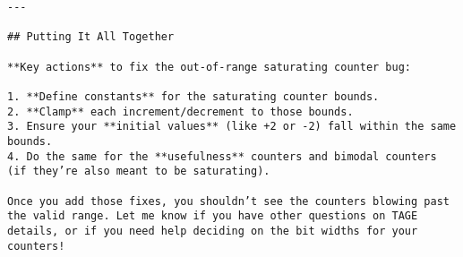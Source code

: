 \documentclass[sigconf, screen]{acmart}
\begin{document}
\begin{Verbatim}[fontsize=\tiny, breaklines=true]
---

## Putting It All Together

**Key actions** to fix the out-of-range saturating counter bug:

1. **Define constants** for the saturating counter bounds.  
2. **Clamp** each increment/decrement to those bounds.  
3. Ensure your **initial values** (like +2 or -2) fall within the same bounds.  
4. Do the same for the **usefulness** counters and bimodal counters (if they’re also meant to be saturating).  

Once you add those fixes, you shouldn’t see the counters blowing past the valid range. Let me know if you have other questions on TAGE details, or if you need help deciding on the bit widths for your counters!
\end{Verbatim}
\end{document}
